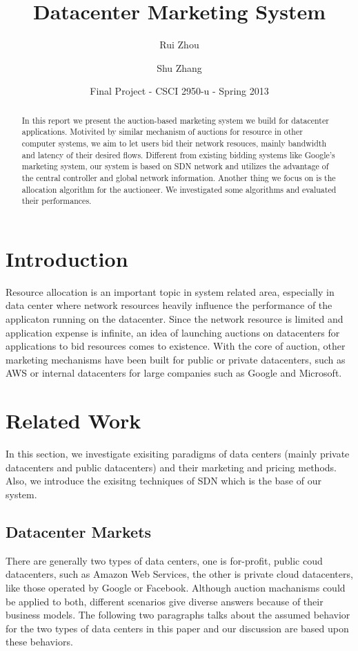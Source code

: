 \documentclass[11pt]{article}
\begin{document}
\title{Datacenter Marketing System}
\author{Rui Zhou \and Shu Zhang}
\date{Final Project - CSCI 2950-u - Spring 2013}
\maketitle

\begin{abstract}
In this report we present the auction-based marketing system we build for datacenter applications.
Motivited by similar mechanism of auctions for resource in other computer systems, we aim to 
let users bid their network resouces, mainly bandwidth and latency of their desired flows. Different from existing 
bidding systems like Google's marketing system\cite{google}, our system is based on SDN network and utilizes the advantage
of the central controller and global network information. 
Another thing we focus on is the allocation algorithm for the auctioneer. We investigated some 
algorithms and evaluated their performances. 
\end{abstract}

\section{Introduction}
Resource allocation is an important topic in system related area, especially in data center where network resources heavily influence the performance 
of the applicaton running on the datacenter. Since the network resource is limited and application expense is infinite, an idea of launching auctions on
datacenters for applications to bid resources comes to existence. With the core of auction, other marketing mechanisms have been built for public or 
private datacenters, such as AWS\cite{aws} or internal datacenters for large companies such as Google and Microsoft. 

\section{Related Work}
In this section, we investigate exisiting paradigms of data centers (mainly private datacenters and public datacenters) and their marketing and 
pricing methods. Also, we introduce the exisitng techniques of SDN which is the base of our system.
\subsection{Datacenter Markets}
There are generally two types of data centers, one is for-profit, public coud datacenters, such as Amazon Web Services\cite{aws}, the other is private cloud
datacenters, like those operated by Google or Facebook. Although auction machanisms could be applied to both, different scenarios give diverse answers because of 
their business models. The following two paragraphs talks about the assumed behavior for the two types of data centers in this paper and our discussion are 
based upon these behaviors.
\end{document}
